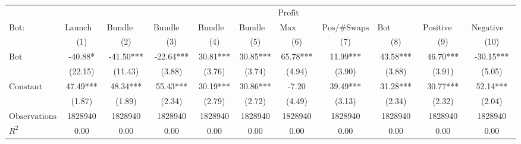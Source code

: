 \begin{tabular}{lcccccccccc}
\hline
 & \multicolumn{10}{c}{$\text{Profit}$} \\
 $\text{Bot}:$ & $\text{Launch Bundle}$ & $\text{Bundle Creator Buy}$ & $\text{Bundle Launch}$ & $\text{Bundle Buy}$ & $\text{Bundle Sell}$ & $\text{Max Same Txn}$ & $\text{Pos/\#Swaps}$ & $\text{Bot Comment}$ & $\text{Positive Bot Comment}$ & $\text{Negative Bot Comment}$ \\
 & (1) & (2) & (3) & (4) & (5) & (6) & (7) & (8) & (9) & (10)\\
\hline
$\text{Bot}$ & -40.88* & -41.50*** & -22.64*** & 30.81*** & 30.85*** & 65.78*** & 11.99*** & 43.58*** & 46.70*** & -30.15*** \\
 & (22.15) & (11.43) & (3.88) & (3.76) & (3.74) & (4.94) & (3.90) & (3.88) & (3.91) & (5.05) \\
$\text{Constant}$ & 47.49*** & 48.34*** & 55.43*** & 30.19*** & 30.86*** & -7.20 & 39.49*** & 31.28*** & 30.77*** & 52.14*** \\
 & (1.87) & (1.89) & (2.34) & (2.79) & (2.72) & (4.49) & (3.13) & (2.34) & (2.32) & (2.04) \\
$\text{Observations}$ & 1828940 & 1828940 & 1828940 & 1828940 & 1828940 & 1828940 & 1828940 & 1828940 & 1828940 & 1828940 \\
$R^2$ & 0.00 & 0.00 & 0.00 & 0.00 & 0.00 & 0.00 & 0.00 & 0.00 & 0.00 & 0.00 \\
\hline
\end{tabular}